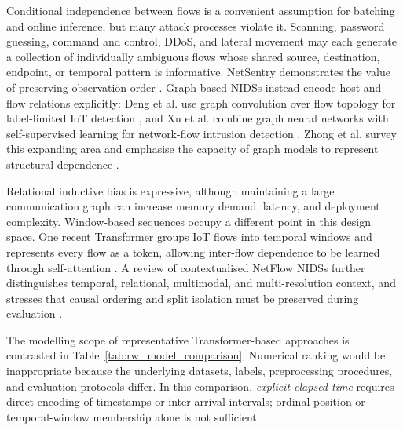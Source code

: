 \documentclass[11pt,fleqn]{report}
\begin{document}
Conditional independence between flows is a convenient assumption for batching and online inference, but many attack processes violate it. Scanning, password guessing, command and control, DDoS, and lateral movement may each generate a collection of individually ambiguous flows whose shared source, destination, endpoint, or temporal pattern is informative. NetSentry demonstrates the value of preserving observation order \cite{LiuPatras2022NetSentry}. Graph-based NIDSs instead encode host and flow relations explicitly: Deng et al. use graph convolution over flow topology for label-limited IoT detection \cite{Deng2023FlowTopology}, and Xu et al. combine graph neural networks with self-supervised learning for network-flow intrusion detection \cite{Xu2024SSLGNN}. Zhong et al. survey this expanding area and emphasise the capacity of graph models to represent structural dependence \cite{Zhong2024GNNSurvey}.

Relational inductive bias is expressive, although maintaining a large communication graph can increase memory demand, latency, and deployment complexity. Window-based sequences occupy a different point in this design space. One recent Transformer groups IoT flows into temporal windows and represents every flow as a token, allowing inter-flow dependence to be learned through self-attention \cite{MartinReizabal2026FlowWindow}. A review of contextualised NetFlow NIDSs further distinguishes temporal, relational, multimodal, and multi-resolution context, and stresses that causal ordering and split isolation must be preserved during evaluation \cite{ElMahdaouy2026ContextNetFlow}.

The modelling scope of representative Transformer-based approaches is contrasted in Table~\ref{tab:rw_model_comparison}. Numerical ranking would be inappropriate because the underlying datasets, labels, preprocessing procedures, and evaluation protocols differ. In this comparison, \emph{explicit elapsed time} requires direct encoding of timestamps or inter-arrival intervals; ordinal position or temporal-window membership alone is not sufficient.
\end{document}
